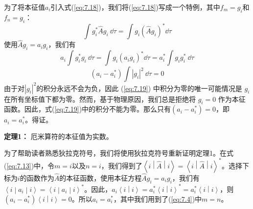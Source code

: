     为了将本征值$a_i$引入式(\ref{eq:7.18})，我们将(\ref{eq:7.18})写成一个特例，其中$f_m = g_i$和$f_n = g_i$：
    \begin{equation*}
        \int g_i^{\ast} \hat{A} g_i \:\dd \tau = \int g_i \left(\hat{A} g_i\right)^{\ast} \dd \tau
    \end{equation*}
    使用$\hat{A} g_i = a_i g_i$，我们有
    \begin{equation*}
        a_i \int g_i^{\ast} g_i \:\dd \tau = \int g_i \left(a_i g_i\right)^{\ast} \dd \tau = a_i^{\ast} \int g_i g_i^{\ast} \:\dd \tau
    \end{equation*}
    \begin{equation}
        \left(a_i - a_i^{\ast}\right) \int \left|g_i\right|^2 \:\dd \tau = 0
        \label{eq:7.19}
    \end{equation}
    由于对$\left|g_i\right|^2$的积分永远不会为负，因此 (\ref{eq:7.19}) 中积分为零的唯一可能情况是 $g_i$ 在所有坐标值下都为零。然而，基于物理原因，我们总是拒绝将 $g_i=0$ 作为本征函数。因此，式(\ref{eq:7.19})中的积分不能为零。那么只有$\left(a_i - a_i^{\ast}\right) = 0$，即$a_i = a_i^{\ast}$。得证。

    \begin{center}
        \parbox{0.8\textwidth}{
            \textbf{定理1：} 厄米算符的本征值为实数。
        }
    \end{center}

    为了帮助读者熟悉狄拉克符号，我们将使用狄拉克符号重新证明定理1。在式(\ref{eq:7.13})中，令$m=i$以及$n=i$，我们得到了$\left\langle i \middle| \hat{A} \middle| i \right\rangle = \left\langle i \middle| \hat{A} \middle| i \right\rangle^{\ast}$。选择下标为$i$的函数作为$\hat{A}$的本征函数，使用本征方程$\hat{A} g_i = a_i g_i$，我们有$\left\langle i \middle| a_i \middle| i \right\rangle = \left\langle i \middle| a_i \middle| i \right\rangle^{\ast}$。因此，$a_i \left\langle i \middle| i \right\rangle = a_i^{\ast} \left\langle i \middle| i \right\rangle^{\ast} = a_i^{\ast}\left\langle i \middle| i \right\rangle$，则$\left(a_i - a_i^{\ast}\right)\left\langle i \middle| i \right\rangle = 0$。所以$a_i = a_i^{\ast}$，其中我们用到了(\ref{eq:7.4})中$m=n$。

